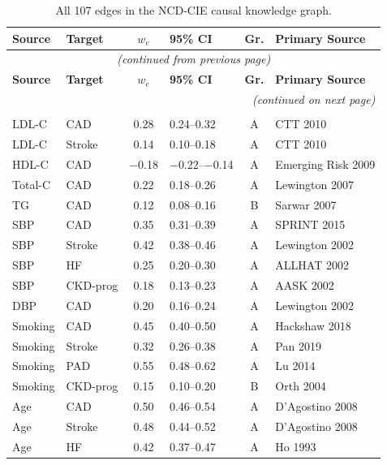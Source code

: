 \documentclass[runningheads]{llncs}
\begin{document}
{\footnotesize
\renewcommand{\arraystretch}{1.05}
\begin{longtable}{@{}p{2.0cm}p{2.0cm}cp{1.4cm}cp{2.8cm}@{}}
\caption{All 107 edges in the NCD-CIE causal knowledge graph.}\label{tab:edges}\\
\toprule
\textbf{Source} & \textbf{Target} & \textbf{$w_e$} & \textbf{95\% CI} & \textbf{Gr.} & \textbf{Primary Source} \\
\midrule
\endfirsthead
\multicolumn{6}{c}{\small\itshape (continued from previous page)} \\
\toprule
\textbf{Source} & \textbf{Target} & \textbf{$w_e$} & \textbf{95\% CI} & \textbf{Gr.} & \textbf{Primary Source} \\
\midrule
\endhead
\midrule
\multicolumn{6}{r}{\small\itshape (continued on next page)} \\
\endfoot
\bottomrule
\endlastfoot
\multicolumn{6}{l}{\textbf{CVD Domain (38 edges)}} \\
\midrule
LDL-C & CAD & 0.28 & 0.24--0.32 & A & CTT 2010 \\
LDL-C & Stroke & 0.14 & 0.10--0.18 & A & CTT 2010 \\
HDL-C & CAD & $-$0.18 & $-$0.22--$-$0.14 & A & Emerging Risk 2009 \\
Total-C & CAD & 0.22 & 0.18--0.26 & A & Lewington 2007 \\
TG & CAD & 0.12 & 0.08--0.16 & B & Sarwar 2007 \\
SBP & CAD & 0.35 & 0.31--0.39 & A & SPRINT 2015 \\
SBP & Stroke & 0.42 & 0.38--0.46 & A & Lewington 2002 \\
SBP & HF & 0.25 & 0.20--0.30 & A & ALLHAT 2002 \\
SBP & CKD-prog & 0.18 & 0.13--0.23 & A & AASK 2002 \\
DBP & CAD & 0.20 & 0.16--0.24 & A & Lewington 2002 \\
Smoking & CAD & 0.45 & 0.40--0.50 & A & Hackshaw 2018 \\
Smoking & Stroke & 0.32 & 0.26--0.38 & A & Pan 2019 \\
Smoking & PAD & 0.55 & 0.48--0.62 & A & Lu 2014 \\
Smoking & CKD-prog & 0.15 & 0.10--0.20 & B & Orth 2004 \\
Age & CAD & 0.50 & 0.46--0.54 & A & D'Agostino 2008 \\
Age & Stroke & 0.48 & 0.44--0.52 & A & D'Agostino 2008 \\
Age & HF & 0.42 & 0.37--0.47 & A & Ho 1993 \\

\end{longtable}}
\end{document}
